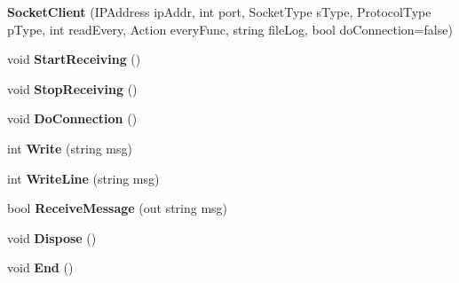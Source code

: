 \begin{DoxyCompactItemize}
\item 
\mbox{\label{class_lerp2_a_p_i_1_1_communication_1_1_sockets_1_1_socket_client_a8612280f05e00348ec5c8adf5e7a416a}} 
{\bfseries Socket\+Client} (I\+P\+Address ip\+Addr, int port, Socket\+Type s\+Type, Protocol\+Type p\+Type, int read\+Every, Action every\+Func, string file\+Log, bool do\+Connection=false)
\item 
\mbox{\label{class_lerp2_a_p_i_1_1_communication_1_1_sockets_1_1_socket_client_ab5071c27cec345d839f551aa36b03624}} 
void {\bfseries Start\+Receiving} ()
\item 
\mbox{\label{class_lerp2_a_p_i_1_1_communication_1_1_sockets_1_1_socket_client_ad65ef824326213c3dfd05859f2ef4ac2}} 
void {\bfseries Stop\+Receiving} ()
\item 
\mbox{\label{class_lerp2_a_p_i_1_1_communication_1_1_sockets_1_1_socket_client_a87932ffacb6ed07b68e3036552707471}} 
void {\bfseries Do\+Connection} ()
\item 
\mbox{\label{class_lerp2_a_p_i_1_1_communication_1_1_sockets_1_1_socket_client_ae7feb72367cc1acb725658c8d053bff7}} 
int {\bfseries Write} (string msg)
\item 
\mbox{\label{class_lerp2_a_p_i_1_1_communication_1_1_sockets_1_1_socket_client_a809b07a3650c23ca8e7a6461be951bf8}} 
int {\bfseries Write\+Line} (string msg)
\item 
\mbox{\label{class_lerp2_a_p_i_1_1_communication_1_1_sockets_1_1_socket_client_aa687a95a9fe088832a74333cb2b300a9}} 
bool {\bfseries Receive\+Message} (out string msg)
\item 
\mbox{\label{class_lerp2_a_p_i_1_1_communication_1_1_sockets_1_1_socket_client_a01746b5f397e6d746011b87f53931734}} 
void {\bfseries Dispose} ()
\item 
\mbox{\label{class_lerp2_a_p_i_1_1_communication_1_1_sockets_1_1_socket_client_af1773e74c6de381d92db4b351e2cf4f8}} 
void {\bfseries End} ()
\end{DoxyCompactItemize}
